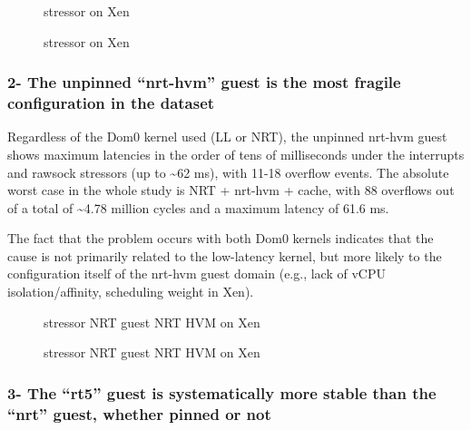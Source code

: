 \begin{figure}
\centering

\caption{stressor on Xen}
\end{figure}

\begin{figure}
\centering

\caption{stressor on Xen}
\end{figure}

\subsubsection{2- The unpinned ``nrt-hvm'' guest is the most fragile
configuration in the
dataset}\label{the-unpinned-nrt-hvm-guest-is-the-most-fragile-configuration-in-the-dataset}

Regardless of the Dom0 kernel used (LL or NRT), the unpinned nrt-hvm
guest shows maximum latencies in the order of tens of milliseconds under
the interrupts and rawsock stressors (up to \textasciitilde62 ms), with
11-18 overflow events. The absolute worst case in the whole study is NRT
+ nrt-hvm + cache, with 88 overflows out of a total of
\textasciitilde4.78 million cycles and a maximum latency of 61.6 ms.

The fact that the problem occurs with both Dom0 kernels indicates that
the cause is not primarily related to the low-latency kernel, but more
likely to the configuration itself of the nrt-hvm guest domain (e.g.,
lack of vCPU isolation/affinity, scheduling weight in Xen).

\begin{figure}
\centering

\caption{stressor NRT guest NRT HVM on Xen}
\end{figure}

\begin{figure}
\centering

\caption{stressor NRT guest NRT HVM on Xen}
\end{figure}

\subsubsection{3- The ``rt5'' guest is systematically more stable than
the ``nrt'' guest, whether pinned or
not}\label{the-rt5-guest-is-systematically-more-stable-than-the-nrt-guest-whether-pinned-or-not}

